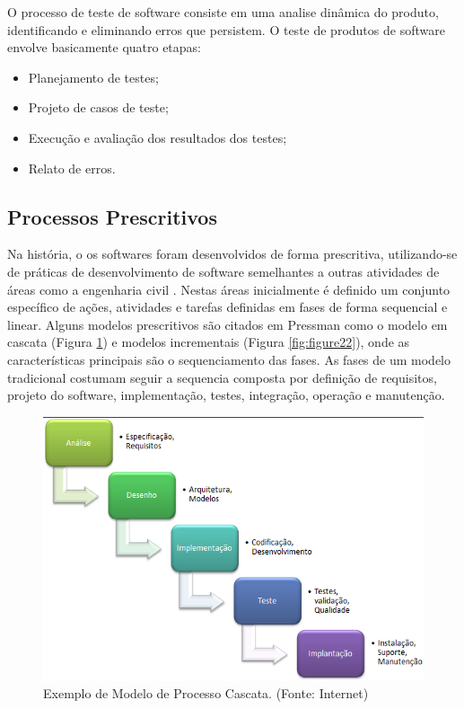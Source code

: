 O processo de teste de software consiste em uma analise dinâmica do produto, identificando e eliminando erros que persistem. O teste de produtos de software envolve basicamente quatro etapas:

\begin{itemize}
    \item Planejamento de testes;
    \item Projeto de casos de teste;
    \item Execução e avaliação dos resultados dos testes;
    \item Relato de erros.
\end{itemize}

\subsection{Processos Prescritivos}

Na história, o os softwares foram desenvolvidos de forma prescritiva, utilizando-se de práticas de desenvolvimento de software semelhantes a outras atividades de áreas como a engenharia civil \cite{BRAGA2015}. Nestas áreas inicialmente é definido um conjunto específico de ações, atividades e tarefas definidas em fases de forma sequencial e linear. Alguns modelos prescritivos são citados em Pressman \cite{PRESSMAN2011} como o modelo em cascata (Figura \ref{fig:figure21}) e modelos incrementais (Figura \ref{fig:figure22}), onde as características principais são o sequenciamento das fases. As fases de um modelo tradicional costumam seguir a sequencia composta por definição de requisitos, projeto do software, implementação, testes, integração, operação e manutenção.

\begin{figure}[!ht]
\centering
\includegraphics[width=.75\textwidth]{fig/figura21.png}
\caption{Exemplo de Modelo de Processo Cascata. (Fonte: Internet)}
\label{fig:figure21}
\end{figure}


